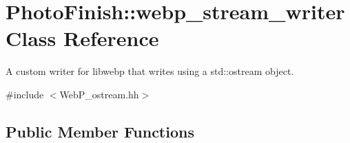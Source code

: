 \hypertarget{class_photo_finish_1_1webp__stream__writer}{}\section{Photo\+Finish\+:\+:webp\+\_\+stream\+\_\+writer Class Reference}
\label{class_photo_finish_1_1webp__stream__writer}


A custom writer for libwebp that writes using a std\+::ostream object.  




{\ttfamily \#include $<$Web\+P\+\_\+ostream.\+hh$>$}

\subsection*{Public Member Functions}
